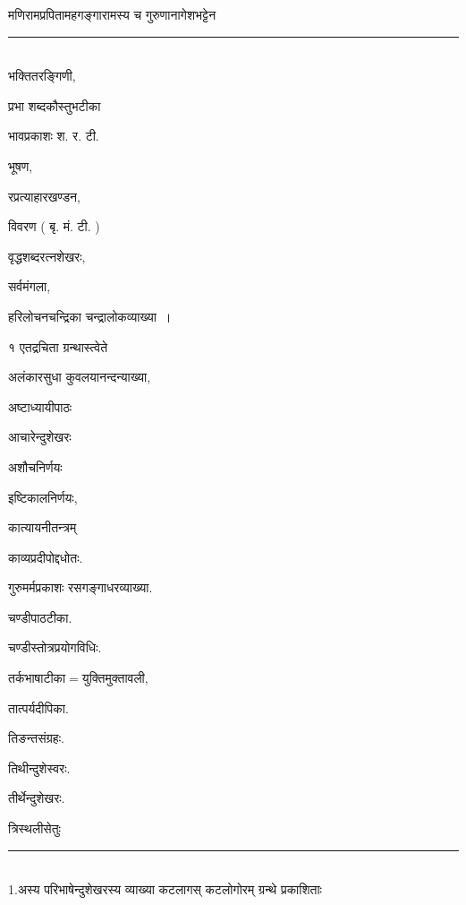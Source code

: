 \documentclass[11pt, openany]{book}
\makeatletter
\newcommand{\devanagarinumeral}[1]{
\devanagaridigits{\number \csname c@#1\endcsname}} %
\makeatother
\begin{document}
\fancyhead[RO,LE]{\thepage}
\cfoot{}
\newpage
\renewcommand{\thepage}{\devanagarinumeral{page}}
\setcounter{page}{17}


\begin{multicols}{2}
\noindent
मणिरामप्रपितामहगङ्गारामस्य च गुरुणानागेशभट्टेन \\
\noindent
\rule{1\linewidth}{0.5pt}\\

भक्तितरङ्गिणी, 

प्रभा शब्दकौस्तुभटीका 

भावप्रकाशः श. र. टी. 

भूषण, 

रप्रत्याहारखण्डन, 

विवरण ( बृ. मं. टी. ) 

वृद्धशब्दरत्नशेखरः, 

सर्वमंगला, 

हरिलोचनचन्द्रिका चन्द्रालोकव्याख्या~। 

१ एतद्रचिता ग्रन्थास्त्वेते \textendash\ 

अलंकारसुधा कुवलयानन्दन्याख्या, 

अष्टाध्यायीपाठः 

आचारेन्दुशेखरः 

अशौचनिर्णयः

इष्टिकालनिर्णयः, 

कात्यायनीतन्त्रम् \textendash\ 

काव्यप्रदीपोद्दधोतः. 

गुरुमर्मप्रकाशः रसगङ्गाधरव्याख्या. 

चण्डीपाठटीका. 

चण्डीस्तोत्रप्रयोगविधिः. 

तर्कभाषाटीका$=$युक्तिमुक्तावली, 

तात्पर्यदीपिका. 

तिङन्तसंग्रहः. 

तिथीन्दुशेस्वरः. 

तीर्थेन्दुशेखरः. 

त्रिस्थलीसेतुः 

\noindent
\rule{1\linewidth}{0.5pt}\\

1.अस्य परिभाषेन्दुशेखरस्य व्याख्या कटलागस् कटलोगोरम् ग्रन्थे प्रकाशिताः \textendash\ 


\end{multicols}
\end{document}
